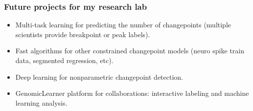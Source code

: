 \documentclass{beamer}
\begin{document}
\begin{frame}
  \frametitle{Future projects for my research lab}
  \begin{itemize}
  \item Multi-task learning for predicting the number of changepoints
    (multiple scientists provide breakpoint or peak labels).
  \item Fast algorithms for other constrained changepoint models
    (neuro spike train data, segmented regression, etc).
  \item Deep learning for nonparametric changepoint detection.
  \item GenomicLearner platform for collaborations: interactive
    labeling and machine learning analysis.
  \end{itemize}
\end{frame}



  
\end{document}
